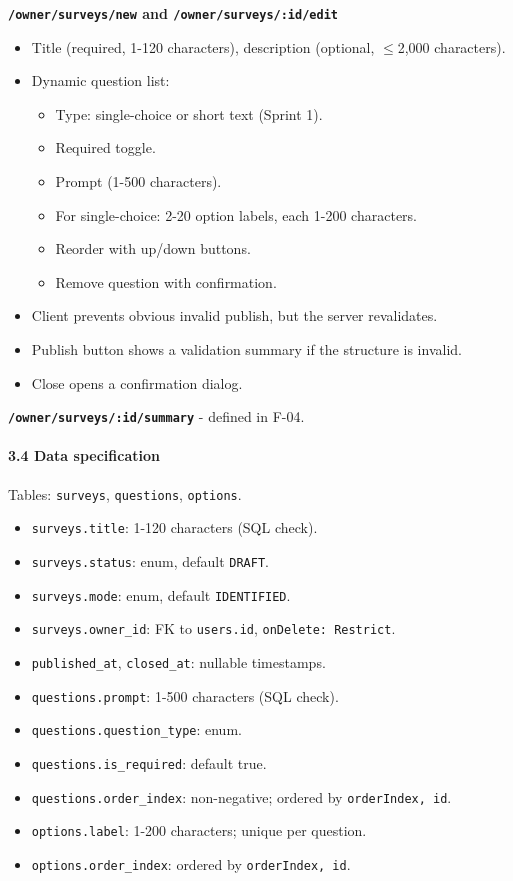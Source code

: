 \documentclass[12pt,a4paper]{article}
\begin{document}
\textbf{\texttt{/owner/surveys/new} and \texttt{/owner/surveys/:id/edit}}

\begin{itemize}[leftmargin=*]
\item Title (required, 1-120 characters), description (optional, $\leq$2,000 characters).
\item Dynamic question list:
\begin{itemize}[leftmargin=*]
\item Type: single-choice or short text (Sprint 1).
\item Required toggle.
\item Prompt (1-500 characters).
\item For single-choice: 2-20 option labels, each 1-200 characters.
\item Reorder with up/down buttons.
\item Remove question with confirmation.
\end{itemize}
\item Client prevents obvious invalid publish, but the server revalidates.
\item Publish button shows a validation summary if the structure is invalid.
\item Close opens a confirmation dialog.
\end{itemize}

\textbf{\texttt{/owner/surveys/:id/summary}} - defined in F-04.

\paragraph*{3.4 Data specification}
Tables: \texttt{surveys}, \texttt{questions}, \texttt{options}.

\begin{itemize}[leftmargin=*]
\item \texttt{surveys.title}: 1-120 characters (SQL check).
\item \texttt{surveys.status}: enum, default \texttt{DRAFT}.
\item \texttt{surveys.mode}: enum, default \texttt{IDENTIFIED}.
\item \texttt{surveys.owner\_id}: FK to \texttt{users.id}, \texttt{onDelete: Restrict}.
\item \texttt{published\_at}, \texttt{closed\_at}: nullable timestamps.
\item \texttt{questions.prompt}: 1-500 characters (SQL check).
\item \texttt{questions.question\_type}: enum.
\item \texttt{questions.is\_required}: default true.
\item \texttt{questions.order\_index}: non-negative; ordered by \texttt{orderIndex, id}.
\item \texttt{options.label}: 1-200 characters; unique per question.
\item \texttt{options.order\_index}: ordered by \texttt{orderIndex, id}.
\end{itemize}
\end{document}
